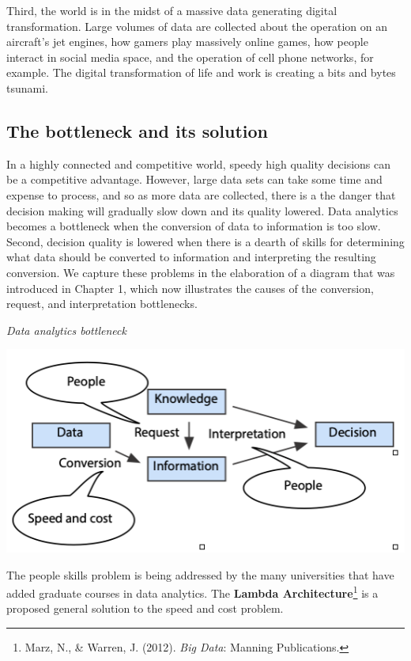 \documentclass[
]{article}
\begin{document}
Third, the world is in the midst of a massive data generating digital
transformation. Large volumes of data are collected about the operation
on an aircraft's jet engines, how gamers play massively online games,
how people interact in social media space, and the operation of cell
phone networks, for example. The digital transformation of life and work
is creating a bits and bytes tsunami.

\hypertarget{the-bottleneck-and-its-solution}{%
\subsection*{The bottleneck and its solution}\label{the-bottleneck-and-its-solution}}

In a highly connected and competitive world, speedy high quality
decisions can be a competitive advantage. However, large data sets can
take some time and expense to process, and so as more data are
collected, there is a the danger that decision making will gradually
slow down and its quality lowered. Data analytics becomes a bottleneck
when the conversion of data to information is too slow. Second, decision
quality is lowered when there is a dearth of skills for determining what
data should be converted to information and interpreting the resulting
conversion. We capture these problems in the elaboration of a diagram
that was introduced in Chapter 1, which now illustrates the causes of
the conversion, request, and interpretation bottlenecks.

\emph{Data analytics bottleneck}

\includegraphics{Figures/Chapter 18/bottleneck.png}

The people skills problem is being addressed by the many universities
that have added graduate courses in data analytics. The \textbf{Lambda
Architecture}\footnote{Marz, N., \& Warren, J. (2012). \emph{Big Data}:
  Manning Publications.} is a proposed general solution to
the speed and cost problem.
\end{document}
